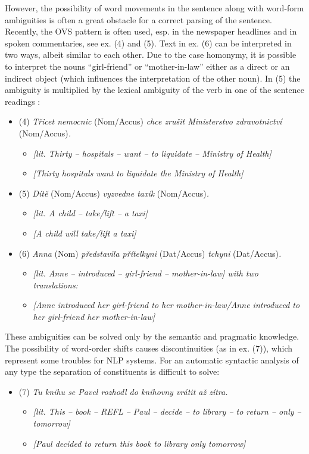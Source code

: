 \begin{multicols}{2}
However, the possibility of word movements in the sentence along with word-form ambiguities is often a great obstacle for a correct parsing of the sentence. Recently, the OVS pattern is often used, esp. in the newspaper headlines and in spoken commentaries, see ex. (4) and (5). Text in ex. (6) can be interpreted in two ways, albeit similar to each other. Due to the case homonymy, it is possible to interpret the nouns “girl-friend” or “mother-in-law” either as a direct or an indirect object (which influences the interpretation of the other noun). In (5) the ambiguity is multiplied by the lexical ambiguity of the verb in one of the sentence readings \cite{Note4}:
\begin{itemize}	
\item[] (4)	\textit{Třicet nemocnic} (Nom/Accus) \textit{chce zrušit Ministerstvo zdravotnictví} (Nom/Accus)\textit{.}
\begin{itemize}	
	\item[] \textit{{[}lit. Thirty – hospitals – want – to liquidate – Ministry of Health{]}}
	\item[] \textit{{[}Thirty hospitals want to liquidate the Ministry of Health{]}}
\end{itemize}
 \item[](5)	\textit{Dítě} (Nom/Accus) \textit{vyzvedne taxík} (Nom/Accus)\textit{.}
\begin{itemize}	
	\item[] \textit{{[}lit. A child – take/lift – a taxi{]}}
	\item[] \textit{{[}A child will take/lift a taxi{]}}
\end{itemize}
 \item[](6)	\textit{Anna} (Nom) \textit{představila přítelkyni} (Dat/Accus) \textit{tchyni} (Dat/Accus)\textit{.}
\begin{itemize}	
	\item[] \textit{{[}lit. Anne – introduced --  girl-friend –  mother-in-law{]} with two translations:}
	\item[] \textit{{[}Anne introduced her girl-friend to her mother-in-law/Anne introduced to her girl-friend her mother-in-law{]}}
\end{itemize}
\end{itemize}

These ambiguities can be solved only by the semantic and pragmatic knowledge.
The possibility of word-order shifts causes discontinuities (as in ex. (7)), which represent some troubles for NLP systems. For an automatic syntactic analysis of any type the separation of constituents is difficult to solve:
\begin{itemize}
 \item[] (7)	\textit{Tu knihu se Pavel rozhodl do knihovny vrátit až zítra.}
\begin{itemize}	
	\item[] \textit{{[}lit. This – book – REFL – Paul – decide – to library – to return – only – tomorrow{]}}
	\item[] \textit{{[}Paul decided to return this book to library only tomorrow{]}}
\end{itemize}
\end{itemize}

\end{multicols}
